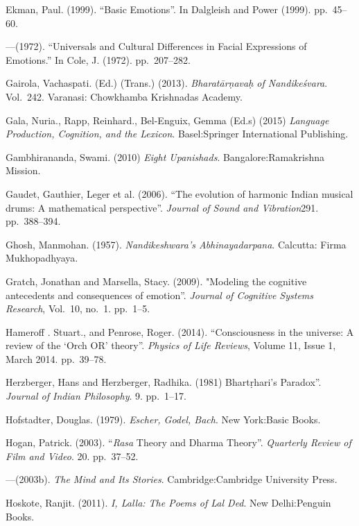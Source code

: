 \begin{thebibliography}{99}
Ekman, Paul. (1999). ``Basic Emotions''. In Dalgleish and Power (1999). pp.~45--60.

---\kern3pt(1972). ``Universals and Cultural Differences in Facial Expressions of Emotions.'' In Cole, J. (1972). pp.~207--282.

Gairola, Vachaspati. (Ed.) (Trans.) (2013). \textsl{Bharatārṇavaḥ of Nandikeśvara}. Vol.~242. Varanasi: Chowkhamba Krishnadas Academy.

Gala, Nuria., Rapp, Reinhard., Bel-Enguix, Gemma (Ed.s) (2015) \textsl{Language Production, Cognition, and the Lexicon}. Basel:Springer International Publishing.

Gambhirananda, Swami. (2010) \textsl{Eight Upanishads}. Bangalore:Ramakrishna Mission.

Gaudet, Gauthier, Leger et al. (2006). “The evolution of harmonic Indian musical drums: A mathematical perspective”. \textsl{Journal of Sound and Vibration}291. pp.~388--394.

Ghosh, Manmohan. (1957). \textsl{Nandikeshwara’s Abhinayadarpana}. Calcutta: Firma Mukhopadhyaya.

Gratch, Jonathan and Marsella, Stacy. (2009). "Modeling the cognitive antecedents and consequences of emotion”. \textsl{Journal of Cognitive Systems Research}, Vol.~10, no.~1. pp.~1--5.

Hameroff . Stuart., and Penrose, Roger. (2014). “Consciousness in the universe: A review of the ‘Orch OR’ theory”. \textsl{Physics of Life Reviews}, Volume 11, Issue 1, March 2014. pp.~39--78.

Herzberger, Hans and Herzberger, Radhika. (1981) Bhartṛhari's Paradox”. \textsl{Journal of Indian Philosophy}. 9. pp.~1--17.

Hofstadter, Douglas. (1979). \textsl{Escher, Godel, Bach}. New York:Basic Books.

Hogan, Patrick. (2003). “\textsl{Rasa} Theory and Dharma Theory”. \textsl{Quarterly Review of Film and Video}. 20. pp.~37--52.

---\kern3pt(2003b). \textsl{The Mind and Its Stories}. Cambridge:Cambridge University Press.

Hoskote, Ranjit. (2011). \textsl{I, Lalla: The Poems of Lal Ded}. New Delhi:Penguin Books.


\end{thebibliography}
